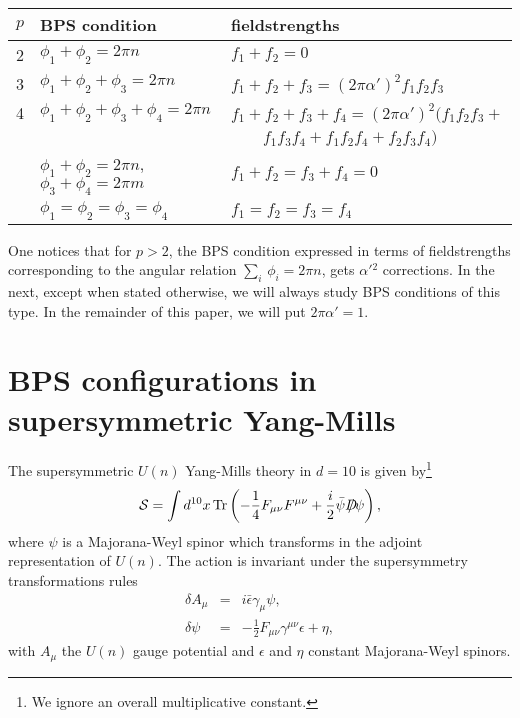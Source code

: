 \documentclass[a4paper,12pt,oneside]{article}
\begin{document}
\begin{center}
\begin{tabular}{|c|l|l|}\hline\hline
$p$ &BPS condition &fieldstrengths\\ \hline\hline
2 &$\phi_1+\phi_2=2\pi n$ & $f_1+f_2=0$\\ \hline
3 &$\phi_1+\phi_2+\phi_3=2\pi n$ & $f_1+f_2+f_3=(2\pi\alpha ')^2f_1f_2f_3$\\ \hline
4 &$\phi_1+\phi_2+\phi_3+\phi_4=2\pi n$ & $f_1+f_2+f_3+f_4=(2\pi\alpha ')^2(f_1f_2f_3+$\\
&&$\qquad f_1f_3f_4+f_1f_2f_4+f_2f_3f_4)$
\\ \cline{2-3}
  &$\phi_1+\phi_2=2\pi n$, $\phi_3+\phi_4=2\pi m$&$f_1+f_2=f_3+f_4=0$\\ \cline{2-3}
  &$\phi_1=\phi_2=\phi_3=\phi_4$&$f_1=f_2=f_3=f_4$ 
\\ \hline\hline
\end{tabular}
\end{center}

\noindent One notices that for $p>2$, the BPS condition expressed
in terms of fieldstrengths corresponding to the angular relation $\sum_i\,\phi_i=2\pi n$, 
gets $\alpha '{}^2$ corrections. In the next, except 
when stated otherwise, we will always study BPS conditions of this type. 
In the remainder of this paper, we will put $2\pi\alpha '=1$.

\setcounter{equation}{0}
\section{BPS configurations in supersymmetric Yang-Mills}
The supersymmetric $U(n)$ Yang-Mills theory in $d=10$ is given 
by\footnote{We ignore an overall multiplicative constant.}
\begin{eqnarray}
{\cal S}=\int d^{10}x\,\mbox{Tr}\left(-\frac 1 4 F_{\mu \nu}F^{\mu \nu}+\frac i 2
\bar\psi D\!\!\!\!/\psi\right), \label{ac1}
\end{eqnarray}
where $\psi$ is a Majorana-Weyl spinor which transforms in 
the adjoint representation of $U(n)$. The action is invariant under the 
supersymmetry transformations rules
\begin{eqnarray}
\delta A_\mu &=& i  \bar\epsilon\gamma_\mu\psi,\\
\delta\psi&=&-\frac 1 2 F_{\mu \nu}\gamma^{\mu \nu}\epsilon+\eta, \label{dpsi}
\end{eqnarray}
with $A_\mu $ the $U(n)$ gauge potential and $\epsilon$ and $\eta$ constant 
Majorana-Weyl spinors. 
\end{document}
